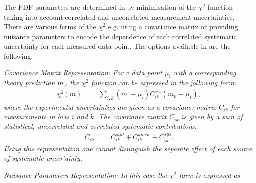 The PDF parameters are determined in \fitter by minimisation of the
$\chi^2$ function taking into account correlated and uncorrelated measurement uncertainties.
There are various forms of the $\chi^2$ 
e.g. using a covariance matrix or providing nuisance parameters to encode the dependence of 
each correlated systematic uncertainty for each measured data point.
The options available in \fitter are the following:
\begin{description}
\item \it {Covariance Matrix Representation:} \rm
For a data point $\mu_i$ with a corresponding theory prediction $m_i$, 
the $\chi^2$ function 
can be expressed in the following form:
%
\begin{eqnarray}
\chi^2 (m)& = & \sum_{i,k}(m_i-\mu_i)C^{-1}_{ik}(m_k-\mu_k),
\end{eqnarray}
where the experimental uncertainties are given as a covariance matrix $C_{ik}$ for measurements in bins $i$ and $k$.
The covariance matrix $C_{ik}$ is given by a sum of statistical, uncorrelated and correlated systematic contributions: 
\begin{eqnarray}
C_{ik}& = & C^{stat}_{ik}+C^{uncor}_{ik}+C^{sys}_{ik}.
\end{eqnarray}
Using this representation one cannot distinguish the separate effect of each source of systematic uncertainty. 
\item \it{Nuisance Parameters Representation:} \rm
In this case the $\chi^2$ form is expressed as
\label{sec:nuisance_representation}

\end{description}
